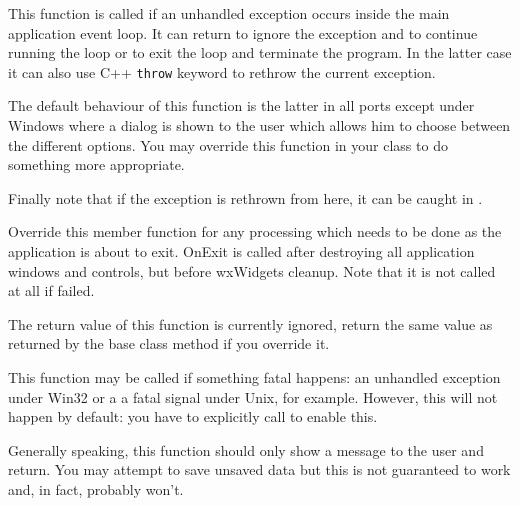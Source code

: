 


\label{wxapponexceptioninmainloop}


This function is called if an unhandled exception occurs inside the main
application event loop. It can return \true to ignore the exception and to
continue running the loop or \false to exit the loop and terminate the
program. In the latter case it can also use C++ \texttt{throw} keyword to
rethrow the current exception.

The default behaviour of this function is the latter in all ports except under
Windows where a dialog is shown to the user which allows him to choose between
the different options. You may override this function in your class to do
something more appropriate.

Finally note that if the exception is rethrown from here, it can be caught in 
.


\label{wxapponexit}


Override this member function for any processing which needs to be
done as the application is about to exit. OnExit is called after
destroying all application windows and controls, but before
wxWidgets cleanup. Note that it is not called at all if 
 failed.

The return value of this function is currently ignored, return the same value
as returned by the base class method if you override it.


\label{wxapponfatalexception}


This function may be called if something fatal happens: an unhandled
exception under Win32 or a a fatal signal under Unix, for example. However,
this will not happen by default: you have to explicitly call 
 to enable this.

Generally speaking, this function should only show a message to the user and
return. You may attempt to save unsaved data but this is not guaranteed to
work and, in fact, probably won't.

